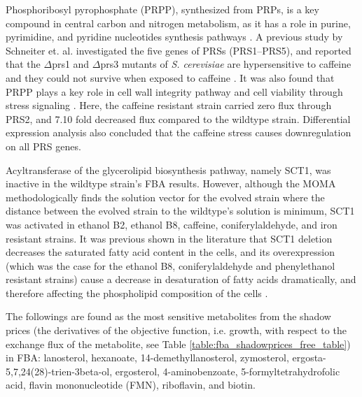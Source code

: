 Phosphoribosyl pyrophosphate (PRPP), synthesized from PRPs, is a key compound in central carbon and nitrogen metabolism, as it has a role in purine, pyrimidine, and pyridine nucleotides synthesis pathways \cite{jimenez2008phosphoribosyl}. A previous study by Schneiter et. al. investigated the five genes of PRSs (PRS1–PRS5), and reported that the $\Delta$prs1 and $\Delta$prs3 mutants of \emph{S. cerevisiae} are hypersensitive to caffeine and they could not survive when exposed to caffeine \cite{schneiter2000importance}. It was also found that PRPP plays a key role in cell wall integrity pathway and cell viability through stress signaling \cite{ugbogu2013contribution}. Here, the caffeine resistant strain carried zero flux through PRS2, and 7.10 fold decreased flux compared to the wildtype strain. Differential expression analysis also concluded that the caffeine stress causes downregulation on all PRS genes.

Acyltransferase of the glycerolipid biosynthesis pathway, namely SCT1, was inactive in the wildtype strain's FBA results. However, although the MOMA methodologically finds the solution vector for the evolved strain where the distance between the evolved strain to the wildtype's solution is minimum, SCT1 was activated in ethanol B2, ethanol B8, caffeine, coniferylaldehyde, and iron resistant strains. It was previous shown in the literature that SCT1 deletion decreases the saturated fatty acid content in the cells, and its overexpression (which was the case for the ethanol B8, coniferylaldehyde and phenylethanol resistant strains) cause a decrease in desaturation of fatty acids dramatically, and therefore affecting the phospholipid composition of the cells \cite{de2012yeast}.

The followings are found as the most sensitive metabolites from the shadow prices (the derivatives of the objective function, i.e. growth, with respect to the exchange flux of the metabolite, see Table \ref{table:fba_shadowprices_free_table}) in FBA: lanosterol, hexanoate, 14-demethyllanosterol, zymosterol, ergosta-5,7,24(28)-trien-3beta-ol, ergosterol, 4-aminobenzoate, 5-formyltetrahydrofolic acid, flavin mononucleotide (FMN), riboflavin, and biotin.

